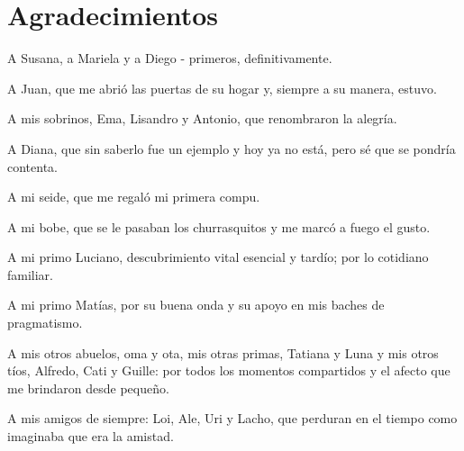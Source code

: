 \chapter*{Agradecimientos}

\noindent A Susana, a Mariela y a Diego - primeros, definitivamente. \newline

\medskip

\noindent A Juan, que me abrió las puertas de su hogar y, siempre a su manera, estuvo. \newline

\medskip

\noindent A mis sobrinos, Ema, Lisandro y Antonio, que renombraron la alegría.  \newline

\medskip

\noindent A Diana, que sin saberlo fue un ejemplo y hoy ya no está, pero sé que se pondría contenta. \newline

\medskip

\noindent A mi seide, que me regaló mi primera compu.  \newline

\medskip

\noindent A mi bobe, que se le pasaban los churrasquitos y me marcó a fuego el gusto. \newline

\medskip

\noindent A mi primo Luciano, descubrimiento vital esencial y tardío; por lo cotidiano familiar. \newline

\medskip

\noindent A mi primo Matías, por su buena onda y su apoyo en mis baches de pragmatismo. \newline

\medskip

\noindent A mis otros abuelos, oma y ota, mis otras primas, Tatiana y Luna y mis otros tíos, Alfredo, Cati y Guille: por todos los momentos compartidos y el afecto que me brindaron desde pequeño. \newline

\medskip

\noindent A mis amigos de siempre: Loi, Ale, Uri y Lacho, que perduran en el tiempo como imaginaba que era la amistad. \newline

\medskip

